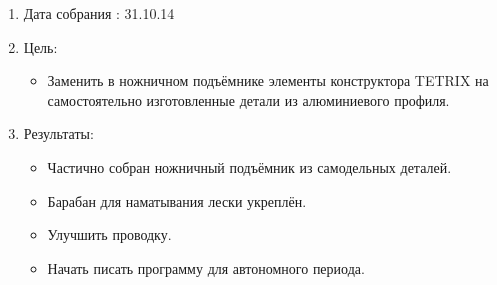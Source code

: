
	\begin{enumerate}
		\item Дата собрания : 31.10.14
		\item Цель:
		\begin{itemize}
			\item Заменить в ножничном подъёмнике элементы конструктора TETRIX на самостоятельно изготовленные детали из алюминиевого профиля.
	    \end{itemize}
	    \item Результаты:
	    \begin{itemize}
	    	\item Частично собран ножничный подъёмник из самодельных деталей.
	    	\item Барабан для наматывания лески укреплён.
	    \end{itemize}
	    \begin{itemize}
	   	    \item Улучшить проводку.
	   	    \item Начать писать программу для автономного периода.
	   	\end{itemize}
    \end{enumerate}    	
   
	    